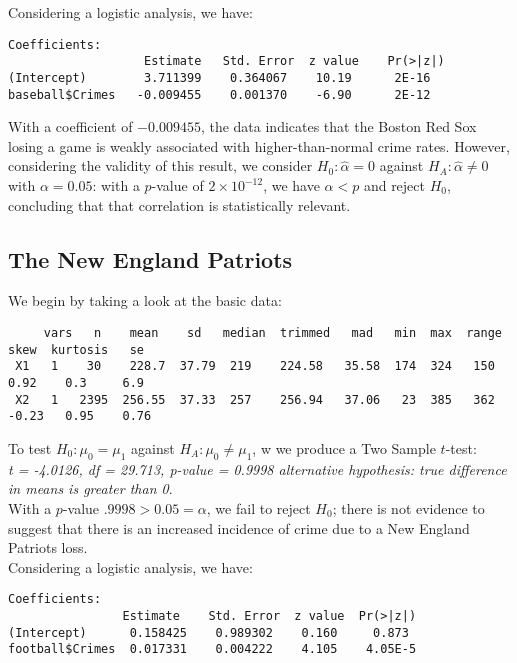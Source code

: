 \documentclass{article}
\begin{document}
Considering a logistic analysis, we have:  \\

\begin{verbatim}
Coefficients:
                   Estimate   Std. Error  z value    Pr(>|z|)
(Intercept)        3.711399    0.364067    10.19      2E-16
baseball$Crimes   -0.009455    0.001370    -6.90      2E-12
\end{verbatim}


With a coefficient of $-0.009455$, the data indicates that the Boston Red Sox losing a game is weakly associated with higher-than-normal crime rates. However, considering the validity of this result, we consider $H_0: \hat{\alpha} = 0$ against $H_A: \hat{\alpha} \neq 0$ with $\alpha = 0.05$: with a $p$-value of $2\times10^{-12}$, we have $\alpha < p$ and reject $H_0$, concluding that that correlation is statistically relevant. 
\subsection{The New England Patriots}

We begin by taking a look at the basic data: 

\begin{verbatim}
     vars   n    mean    sd   median  trimmed   mad   min  max  range  skew  kurtosis   se
 X1   1    30    228.7  37.79  219    224.58   35.58  174  324   150   0.92    0.3     6.9
 X2   1   2395  256.55  37.33  257    256.94   37.06   23  385   362  -0.23   0.95    0.76
\end{verbatim}

To test $H_0: \mu_0 = \mu_1$ against $H_A: \mu_0 \neq \mu_1$, w we produce a Two Sample $t$-test:\\

\textit{
t = -4.0126, df = 29.713, p-value = 0.9998
alternative hypothesis: true difference in means is greater than 0}. \\

With a $p$-value $.9998 > 0.05 = \alpha$, we fail to reject $H_0$; there is not evidence to suggest that there is an increased incidence of crime due to a New England Patriots loss. \\

Considering a logistic analysis, we have:  \\

\begin{verbatim}
Coefficients:
                Estimate    Std. Error  z value  Pr(>|z|)
(Intercept)      0.158425    0.989302    0.160     0.873
football$Crimes  0.017331    0.004222    4.105    4.05E-5
\end{verbatim}
\end{document}
